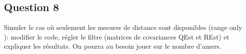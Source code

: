 \documentclass[../CSC_5RO12_TA_TP2.tex]{subfiles}
\begin{document}
\subsection{Question 8}

Simuler le cas où seulement les mesures de distance sont disponibles (range only ): modifier le code, régler le filtre (matrices de covariances QEst et REst) et expliquer les résultats. On pourra au besoin jouer sur le nombre d'amers.
\end{document}

